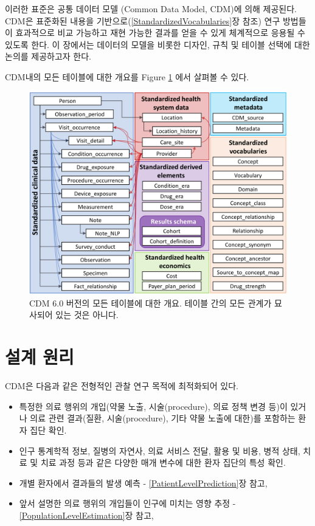 \documentclass[11pt]{book}
\providecommand{\tightlist}{%
  \setlength{\itemsep}{0pt}\setlength{\parskip}{0pt}}
\theoremstyle{definition}
\theoremstyle{definition}
\theoremstyle{definition}
\theoremstyle{remark}
\begin{document}
이러한 표준은 공통 데이터 모델 (Common Data Model, CDM)에 의해 제공된다.
CDM은 표준화된 내용을 기반으로(\ref{StandardizedVocabularies}장 참조)
연구 방법들이 효과적으로 비교 가능하고 재현 가능한 결과를 얻을 수 있게
체계적으로 응용될 수 있도록 한다. 이 장에서는 데이터의 모델을 비롯한
디자인, 규칙 및 테이블 선택에 대한 논의를 제공하고자 한다.

CDM내의 모든 테이블에 대한 개요를 Figure \ref{fig:cdmDiagram}
에서 살펴볼 수 있다.

\begin{figure}
\includegraphics[width=1\linewidth]{images/CommonDataModel/cdmDiagram} \caption{CDM 6.0 버전의 모든 테이블에 대한 개요. 테이블 간의 모든 관계가 묘사되어 있는 것은 아니다.}\label{fig:cdmDiagram}
\end{figure}

\section{설계 원리}\label{-}

CDM은 다음과 같은 전형적인 관찰 연구 목적에 최적화되어
있다.

\begin{itemize}
\tightlist
\item
  특정한 의료 행위의 개입(약물 노출, 시술(procedure), 의료 정책 변경
  등)이 있거나 의료 관련 결과(질환, 시술(procedure), 기타 약물 노출에
  대한)를 포함하는 환자 집단 확인.
\item
  인구 통계학적 정보, 질병의 자연사, 의료 서비스 전달, 활용 및 비용,
  병적 상태, 치료 및 치료 과정 등과 같은 다양한 매개 변수에 대한 환자
  집단의 특성 확인.
\item
  개별 환자에서 결과들의 발생 예측 - \ref{PatientLevelPrediction}장
  참고,
\item
  앞서 설명한 의료 행위의 개입들이 인구에 미치는 영향 추정 -
  \ref{PopulationLevelEstimation}장 참고,
\end{itemize}
\end{document}
